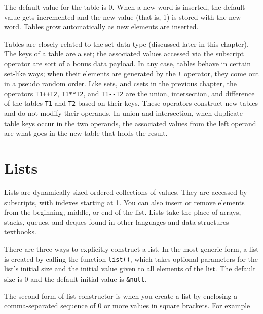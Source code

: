 
The default value for the table is 0. When a new word is inserted, the
default value gets incremented and the new value (that is, 1) is stored
with the new word. Tables grow automatically as new elements are
inserted.

Tables are closely related to the set data type (discussed later in
this chapter). The keys of a table are a set; the associated values
accessed via the subscript operator are
sort of a bonus data payload.
In any case, tables behave in certain set-like ways; when
their elements are generated by the \texttt{!} operator, they come out
in a pseudo random order. Like sets, and csets in the previous chapter,
the operators \texttt{T1++T2},
\texttt{T1**T2},
and \texttt{T1-{}-T2} are the union,
intersection, and difference of the tables \texttt{T1} and
\texttt{T2} based on their keys. These operators construct new tables and do
not modify their operands. In union and intersection, when duplicate
table keys occur in the two operands, the associated values from the left
operand are what goes in the new table that holds the result.

\section{Lists}

Lists are dynamically sized ordered
collections of values. They are accessed by subscripts, with indexes
starting at 1. You can also insert or remove
elements from the beginning, middle, or end of the list. Lists take the
place of arrays, stacks, queues,
and deques found in other languages and data structures
textbooks.

There are three ways to explicitly construct a list.  In the most
generic form,
a list is created by calling the function \texttt{list()}, which
takes optional parameters for the list's initial size and the initial value
given to all elements of the list.  The default size is 0 and the
default initial value is \texttt{\&null}.

The second form of list constructor is when you create a list by
enclosing a comma-separated sequence of 0 or more values in square
brackets. For example

